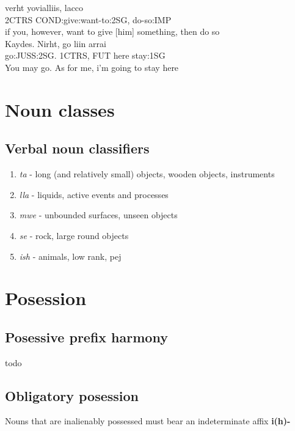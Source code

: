 \documentclass[8pt]{book}
\begin{document}
\begin{exe}
\ex
\gll verht yovialliis, lacco \\
	2CTRS  COND:give:want-to:2SG, do-so:IMP \\
	if you, however, want to give [him] something, then do so \\

\ex
\gll Kaydes. Nirht, go liin arrai \\
    go:JUSS:2SG. 1CTRS, FUT here stay:1SG \\
    You may go. As for me, i'm going to stay here \\
\end{exe}


\section{Noun classes}
\subsection{Verbal noun classifiers}

\begin{enumerate}
\item \textit{ta} - long (and relatively small) objects, wooden objects, instruments
\item \textit{lla} - liquids, active events and processes
\item \textit{mwe} - unbounded surfaces, unseen objects
\item \textit{se} - rock,  large round objects
\item \textit{ish} - animals, low rank, pej
\end{enumerate}


\section{Posession}

\subsection{Posessive prefix harmony}

todo

\subsection{Obligatory posession}

Nouns that are inalienably possessed must bear an indeterminate affix \textbf{i(h)-}
\end{document}
